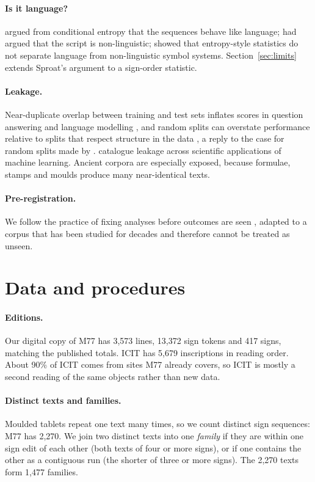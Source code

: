 \documentclass[11pt,a4paper]{article}
\begin{document}
\paragraph{Is it language?} \citet{rao2009} argued from conditional entropy that the sequences behave like language; \citet{farmer2004} had argued that the script is non-linguistic; \citet{sproat2014} showed that entropy-style statistics do not separate language from non-linguistic symbol systems. Section~\ref{sec:limits} extends Sproat's argument to a sign-order statistic.

\paragraph{Leakage.} Near-duplicate overlap between training and test sets inflates scores in question answering \citep{lewis2021} and language modelling \citep{lee2022}, and random splits can overstate performance relative to splits that respect structure in the data \citep{sogaard2021}, a reply to the case for random splits made by \citet{gorman2019}. \citet{kapoor2023} catalogue leakage across scientific applications of machine learning. Ancient corpora are especially exposed, because formulae, stamps and moulds produce many near-identical texts.

\paragraph{Pre-registration.} We follow the practice of fixing analyses before outcomes are seen \citep{nosek2018}, adapted to a corpus that has been studied for decades and therefore cannot be treated as unseen.

\section{Data and procedures}
\label{sec:data}

\paragraph{Editions.} Our digital copy of M77 has 3,573 lines, 13,372 sign tokens and 417 signs, matching the published totals. ICIT has 5,679 inscriptions in reading order. About 90\% of ICIT comes from sites M77 already covers, so ICIT is mostly a second reading of the same objects rather than new data.

\paragraph{Distinct texts and families.} Moulded tablets repeat one text many times, so we count distinct sign sequences: M77 has 2,270. We join two distinct texts into one \emph{family} if they are within one sign edit of each other (both texts of four or more signs), or if one contains the other as a contiguous run (the shorter of three or more signs). The 2,270 texts form 1,477 families.
\end{document}
